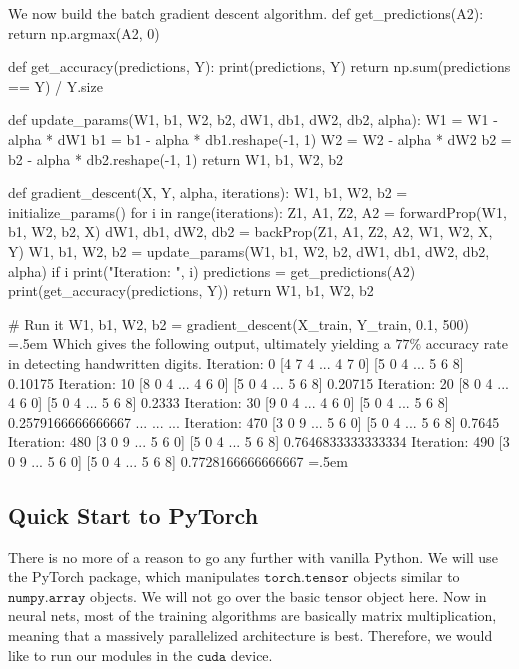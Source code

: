 \documentclass{article}
\newenvironment{cverbatim}
    {\SaveVerbatim{cverb}}
    {\endSaveVerbatim
      \flushleft\fboxrule=0pt\fboxsep=.5em
      \colorbox{cverbbg}{%
        \makebox[\dimexpr\linewidth-2\fboxsep][l]{\BUseVerbatim{cverb}}%
      }
      \endflushleft
  }
\theoremstyle{definition}
\theoremstyle{remark}
\theoremstyle{definition}
\begin{document}
    We now build the batch gradient descent algorithm. 
    \begin{cverbatim}
    def get_predictions(A2):
        return np.argmax(A2, 0)

    def get_accuracy(predictions, Y):
        print(predictions, Y)
        return np.sum(predictions == Y) / Y.size

    def update_params(W1, b1, W2, b2, dW1, db1, dW2, db2, alpha):
        W1 = W1 - alpha * dW1
        b1 = b1 - alpha * db1.reshape(-1, 1)    
        W2 = W2 - alpha * dW2  
        b2 = b2 - alpha * db2.reshape(-1, 1)       
        return W1, b1, W2, b2

    def gradient_descent(X, Y, alpha, iterations): 
        W1, b1, W2, b2 = initialize_params()
        for i in range(iterations):
            Z1, A1, Z2, A2 = forwardProp(W1, b1, W2, b2, X)
            dW1, db1, dW2, db2 = backProp(Z1, A1, Z2, A2, W1, W2, X, Y)
            W1, b1, W2, b2 = update_params(W1, b1, W2, b2, dW1, db1, dW2, db2, alpha)
            if i %
                print("Iteration: ", i)
                predictions = get_predictions(A2)
                print(get_accuracy(predictions, Y))
        return W1, b1, W2, b2

  # Run it
    W1, b1, W2, b2 = gradient_descent(X_train, Y_train, 0.1, 500)
    \end{cverbatim}
    Which gives the following output, ultimately yielding a $77\%$ accuracy rate in detecting handwritten digits. 
    \begin{cverbatim}
    Iteration:  0
    [4 7 4 ... 4 7 0] [5 0 4 ... 5 6 8]
    0.10175
    Iteration:  10
    [8 0 4 ... 4 6 0] [5 0 4 ... 5 6 8]
    0.20715
    Iteration:  20
    [8 0 4 ... 4 6 0] [5 0 4 ... 5 6 8]
    0.2333
    Iteration:  30
    [9 0 4 ... 4 6 0] [5 0 4 ... 5 6 8]
    0.2579166666666667
    ...
    ...
    ...
    Iteration:  470
    [3 0 9 ... 5 6 0] [5 0 4 ... 5 6 8]
    0.7645
    Iteration:  480
    [3 0 9 ... 5 6 0] [5 0 4 ... 5 6 8]
    0.7646833333333334
    Iteration:  490
    [3 0 9 ... 5 6 0] [5 0 4 ... 5 6 8]
    0.7728166666666667
    \end{cverbatim}

  \subsection{Quick Start to PyTorch}

    There is no more of a reason to go any further with vanilla Python. We will use the PyTorch package, which manipulates $\texttt{torch.tensor}$ objects similar to $\texttt{numpy.array}$ objects. We will not go over the basic tensor object here. Now in neural nets, most of the training algorithms are basically matrix multiplication, meaning that a massively parallelized architecture is best. Therefore, we would like to run our modules in the $\texttt{cuda}$ device. 
\end{document}

